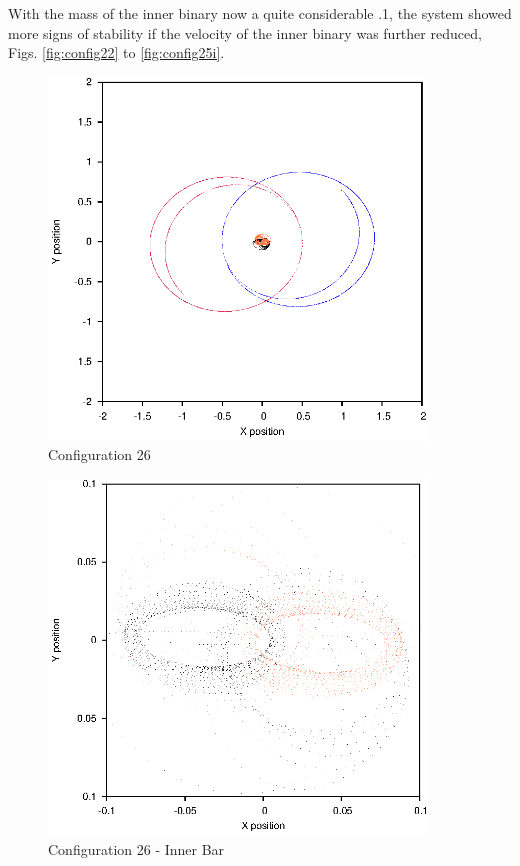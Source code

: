 \documentclass[a4paper,12pt]{article}
\begin{document}
With the mass of the inner binary now a quite considerable .1, the system showed more signs of stability if the velocity of the inner binary was further reduced, Figs. \ref{fig:config22} to \ref{fig:config25i}.

\begin{figure}[H]
\centering
\includegraphics[width=0.9\textwidth]{./2017results/12-105-11-015/Orbit.eps}
\caption{Configuration 26}
\label{fig:config26}
\end{figure}
\begin{figure}[H]
\centering
\includegraphics[width=0.9\textwidth]{./2017results/12-105-11-015/Inner.eps}
\caption{Configuration 26 - Inner Bar}
\label{fig:config26i}
\end{figure}
\end{document}
